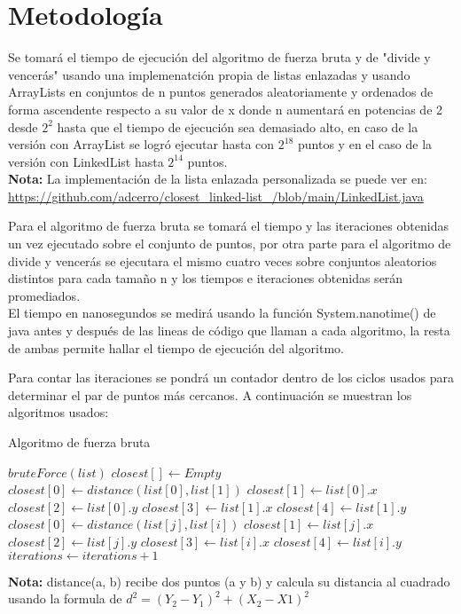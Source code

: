 \section{Metodología}
Se tomará el tiempo de ejecución del algoritmo de fuerza bruta y de "divide y vencerás" usando una implemenatción propia de listas enlazadas y usando ArrayLists en conjuntos de n puntos generados aleatoriamente y ordenados de forma ascendente respecto a su valor de x donde n aumentará en potencias de 2 desde $2^2$ hasta que el tiempo de ejecución sea demasiado alto, en caso de la versión con ArrayList se logró ejecutar hasta con $2^{18}$ puntos y en el caso de la versión con LinkedList hasta  $2^{14}$ puntos.\\

\textbf{Nota:} La implementación de la lista enlazada personalizada se puede ver en: \url{https://github.com/adcerro/closest_linked-list_/blob/main/LinkedList.java}

Para el algoritmo de fuerza bruta se tomará el tiempo y las iteraciones obtenidas un vez ejecutado sobre el conjunto de puntos, por otra parte para el algoritmo de divide y vencerás se ejecutara el mismo cuatro veces sobre conjuntos aleatorios distintos para cada tamaño n y los tiempos e iteraciones obtenidas serán promediados.\\

El tiempo en nanosegundos se medirá usando la función System.nanotime() de java antes y después de las lineas de código que llaman a cada algoritmo, la resta de ambas permite hallar el tiempo de ejecución del algoritmo.

Para contar las  iteraciones se pondrá un contador dentro de los ciclos usados para determinar el par de puntos más cercanos. A continuación se muestran los algoritmos usados:

\begin{algorithm}[h!]
\caption{Algoritmo de fuerza bruta}
\begin{algorithmic}
\State $bruteForce(list)$
    \State $closest[] \gets Empty$
    \State $closest[0] \gets distance(list[0], list[1])$
    \State $closest[1] \gets list[0].x$
    \State $closest[2] \gets list[0].y$
    \State $closest[3] \gets list[1].x$
    \State $closest[4] \gets list[1].y$
            \State $closest[0] \gets distance(list[j], list[i])$
            \State $ closest[1] \gets list[j].x$
            \State $ closest[2] \gets list[j].y$
            \State $ closest[3] \gets list[i].x$
            \State $ closest[4] \gets list[i].y$
        \EndIf
        \EndFor
        \State $ iterations \gets iterations + 1$
    \EndFor
\end{algorithmic}    
\end{algorithm}
\textbf{Nota:} distance(a, b) recibe dos puntos (a y b) y calcula su distancia al cuadrado usando la formula de $d^2 =(Y_2-Y_1)^2+(X_2-X1)^2$\\

